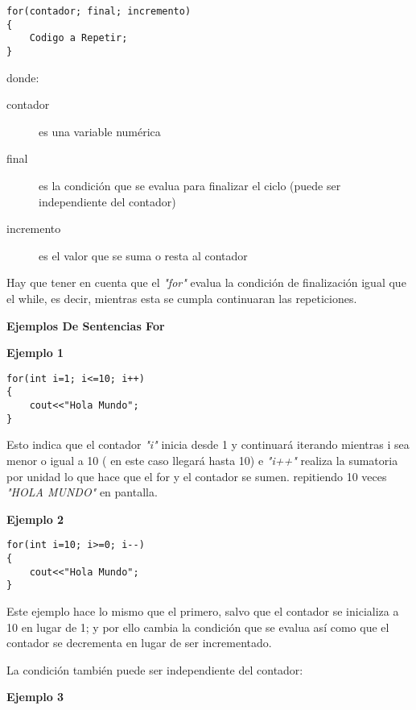 \begin{lstlisting}[style=Cpp, label=sintaxis-for, caption=Sintaxis For]
for(contador; final; incremento)
{
    Codigo a Repetir;
}
\end{lstlisting}

donde:

\begin{description}
\item [contador] es una variable numérica
\item [final] es la condición que se evalua para finalizar el ciclo (puede ser independiente del contador)
\item [incremento] es el valor que se suma o resta al contador
\end{description}

Hay que tener en cuenta que el \textit{"for"} evalua la condición de finalización igual que el while, es decir, mientras esta se cumpla continuaran las repeticiones.

\begin{center}
	\textbf{Ejemplos De Sentencias For}
\end{center}

\textbf{Ejemplo 1}

\begin{lstlisting}[style=Cpp, label=for-ejemplo-1, caption=For Ejemplo 1]
for(int i=1; i<=10; i++)
{
    cout<<"Hola Mundo";   
}
\end{lstlisting}

Esto indica que el contador \textit{"i"} inicia desde 1 y continuará iterando mientras i sea menor o igual a 10 ( en este caso llegará hasta 10) e \textit{"i++"} realiza la sumatoria por unidad lo que hace que el for y el contador se sumen. repitiendo 10 veces \textit{"HOLA MUNDO"} en pantalla.

\textbf{Ejemplo 2}

\begin{lstlisting}[style=Cpp, label=for-ejemplo-2, caption=For Ejemplo 2]
for(int i=10; i>=0; i--)
{
    cout<<"Hola Mundo";   
}
\end{lstlisting}

Este ejemplo hace lo mismo que el primero, salvo que el contador se inicializa a 10 en lugar de 1; y por ello cambia la condición que se evalua así como que el contador se decrementa en lugar de ser incrementado.

La condición también puede ser independiente del contador:

\textbf{Ejemplo 3}

